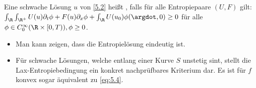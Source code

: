 \begin{df}[Entropielösung] \label{5.5}
    Eine schwache Lösung $u$ von \ref{5.2} heißt , falls für alle Entropiepaare $(U, F)$ gilt:
    \begin{math}[numbered] \label{eq:5.4}
        \int_\R \int_{\R^+} U(u) \partial_t \phi + F(u) \partial_x \phi + \int_\R U(u_0) \phi(\argdot, 0) \ge 0
    \end{math}
    für alle $\phi \in C_0^\infty(\R \times [0,T)), \phi \ge 0$.
    \begin{note}
        \begin{itemize}
            \item
                Man kann zeigen, dass die Entropielösung eindeutig ist.
            \item
                Für schwache Lösungen, welche entlang einer Kurve $S$ unstetig sint, stellt die Lax-Entropiebedingung ein konkret nachprüfbares Kriterium dar.
                Es ist für $f$ konvex sogar äquivalent zu \ref{eq:5.4}.
        \end{itemize}
    \end{note}
\end{df}

